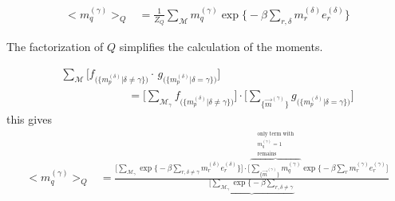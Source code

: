 \begin{frame}
$$
		\begin{array}{lll}
	\big< m_q^{(\gamma)} \big>_Q
	& = \frac{1}{Z_Q} \sum\limits_{\mathscr{M}} m_q^{(\gamma)}
		\exp \Big\{ -\beta \sum\limits_{r, \delta} 
		m_{r}^{(\delta)} e_{r}^{(\delta)} \Big\}
	\end{array}
$$

\begin{itemize}
\itr The factorization of $Q$ simplifies the calculation of the moments.
\end{itemize}

\end{frame}

\begin{frame}
\begin{align}
	\sum\limits_{\mathscr{M}} \Big[ f_{ \big( \big\{ m_p^{(\delta)} 
		\big| \delta \neq \gamma \big\} \big) }
		\cdot \, g_{ \big( \big\{ m_p^{(\delta)} \big| \delta = \gamma 
			\big\} \big) }
		\Big]\\
		\qquad
	\qquad\qquad= \Big[ \sum\limits_{\mathscr{M}_{\gamma}} f_{ \big( \big\{ 
		m_p^{(\delta)} \big| \delta \neq \gamma \big\} \big) }
		\Big] \cdot \Big[ \sum\limits_{\big\{ \vec{m}^{(\gamma)} 
			\big\} } g_{ \big( \big\{ m_p^{(\delta)} \big| \delta = 
			\gamma \big\} \big) } \Big]
\end{align}
this gives
\begin{equation}
	\begin{array}{ll}
	\big< m_q^{(\gamma)} \big>_Q
	& = \frac{ \Bigg[ \sum\limits_{\mathscr{M}_{\gamma}} \exp \Big\{ -\beta
		\sum\limits_{r, \delta \neq \gamma} m_{r}^{(\delta)}
		e_{r}^{(\delta)} \Big\} \Bigg] \cdot \Bigg[ 
		\overbrace{ \sum\limits_{ \big\{ \vec{m}^{(\gamma)} \big\} }
		m_q^{(\gamma)} }^{\substack{	\text{only term with} \\
						m_q^{(\gamma)} = 1 \\
						\text{remains} }}
		\exp \Big\{ -\beta \sum\limits_{r} m_{r}^{(\gamma)}
		e_{r}^{(\gamma)} \Bigg] }{
			\underbrace{
			\Bigg[ \sum\limits_{\mathscr{M}_{\gamma}} \exp 
			\Big\{ -\beta \sum\limits_{r, \delta \neq \gamma} 
}}
\end{array}
\end{equation}
\end{frame}
